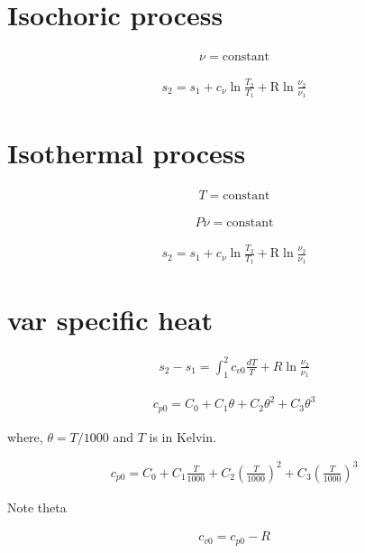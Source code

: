 \documentclass{article}
\begin{document}
	\section{Isochoric process}

	\begin{align*}
		\nu = \text{constant}
	\end{align*}

	\begin{align*}
		s_2 = s_1 + c_\nu \ln\frac{T_2}{T_1} + \text{R}\ln\frac{\nu_2}{\nu_1}
	\end{align*}

	\section{Isothermal process}

	\begin{align*}
		T = \text{constant}
	\end{align*}

	\begin{align*}
		P\nu = \text{constant}
	\end{align*}

	\begin{align*}
		s_2 = s_1 + c_\nu \ln\frac{T_2}{T_1} + \text{R}\ln\frac{\nu_2}{\nu_1}
	\end{align*}




	\section{var specific heat}

	\begin{align*}
		s_2 - s_1 = \int_1^2 c_{v0}\frac{dT}{T} + R\ln\frac{\nu_2}{\nu_1}
	\end{align*}

	\begin{align*}
		c_{p0} = C_0 + C_1\theta + C_2\theta^2 + C_3\theta^3
	\end{align*}

	where, $\theta=T/1000$ and $T$ is in Kelvin.

	\begin{align*}
		c_{p0} = C_0 + C_1\frac{T}{1000} + C_2\left(\frac{T}{1000}\right)^2 + C_3\left(\frac{T}{1000}\right)^3
	\end{align*}

	Note theta
	
	\begin{align*}
		c_{v0} = c_{p0} - R
	\end{align*}
\end{document}
